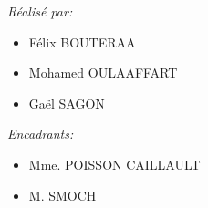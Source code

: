 \documentclass[12pt,a4paper]{report}
\begin{document}
\begin{titlepage}
\begin{sffamily}
\begin{center}
    \begin{minipage}{0.4\textwidth}
      \begin{flushleft} \large
\emph{Réalisé par:} \\
\begin{itemize} 
         \item  Félix \textsc{BOUTERAA}
	 \item  Mohamed \textsc{OULAAFFART}
	 \item    Gaël \textsc{SAGON}
     
\end{itemize} 
        \emph{}
      \end{flushleft}
    \end{minipage}
    \begin{minipage}{0.4\textwidth}
      \begin{flushright} \large
        \emph{Encadrants:}
\begin{itemize} 
     \item    Mme. \textsc{POISSON CAILLAULT}
     \item   M. \textsc{SMOCH}
\end{itemize}
        \emph{}
      \end{flushright}
    \end{minipage}

    \vfill
  \end{center}
  \end{sffamily}
\end{titlepage}
	
	\newpage
	
	\tableofcontents
	
	\newpage
	
	\listoffigures
	
	\newpage
\end{document}

